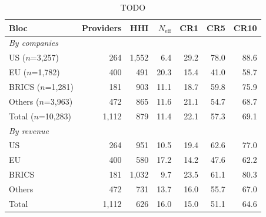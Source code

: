 \begin{table}[t]
\centering
\footnotesize
\caption{TODO}
\label{tab:concentration}
\setlength{\tabcolsep}{4pt}
\begin{tabular}{lrrrrrr}
\toprule
Bloc & Providers & HHI & $N_{\mathrm{eff}}$ & CR1 & CR5 & CR10 \\
\midrule
\multicolumn{7}{l}{\textit{By companies}} \\
\quad US ($n$=3,257) & 264 & 1,552 & 6.4 & 29.2 & 78.0 & 88.6 \\
\quad EU ($n$=1,782) & 400 & 491 & 20.3 & 15.4 & 41.0 & 58.7 \\
\quad BRICS ($n$=1,281) & 181 & 903 & 11.1 & 18.7 & 59.8 & 75.9 \\
\quad Others ($n$=3,963) & 472 & 865 & 11.6 & 21.1 & 54.7 & 68.7 \\
\midrule
\quad Total ($n$=10,283) & 1,112 & 879 & 11.4 & 22.1 & 57.3 & 69.1 \\
\midrule
\multicolumn{7}{l}{\textit{By revenue}} \\
\quad US & 264 & 951 & 10.5 & 19.4 & 62.6 & 77.0 \\
\quad EU & 400 & 580 & 17.2 & 14.2 & 47.6 & 62.2 \\
\quad BRICS & 181 & 1,032 & 9.7 & 23.5 & 61.1 & 80.3 \\
\quad Others & 472 & 731 & 13.7 & 16.0 & 55.7 & 67.0 \\
\midrule
\quad Total & 1,112 & 626 & 16.0 & 15.0 & 51.1 & 64.6 \\
\bottomrule
\end{tabular}
\end{table}
